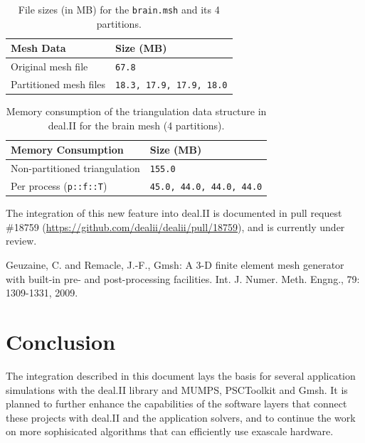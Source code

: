 \documentclass[a4paper,12pt]{article}
\begin{document}
\begin{table}[h!]
    \centering
    \begin{tabular}{@{}ll@{}}
        \toprule
        \textbf{Mesh Data}     & \textbf{Size (MB)}              \\ \midrule
        Original mesh file     & \texttt{67.8}                   \\
        Partitioned mesh files & \texttt{18.3, 17.9, 17.9, 18.0} \\
        \bottomrule
    \end{tabular}
    \caption{File sizes (in MB) for the \texttt{brain.msh} and its 4 partitions.}
    \label{tab:mesh-sizes}
\end{table}

\begin{table}[h!]
    \centering
    \begin{tabular}{@{}ll@{}}
        \toprule
        \textbf{Memory Consumption}    & \textbf{Size (MB)}              \\ \midrule
        Non-partitioned triangulation  & \texttt{155.0}                  \\
        Per process (\texttt{p::f::T}) & \texttt{45.0, 44.0, 44.0, 44.0} \\
        \bottomrule
    \end{tabular}
    \caption{Memory consumption of the triangulation data structure in deal.II for the brain mesh (4 partitions).}
    \label{tab:memory-consumption}
\end{table}


The integration of this new feature into deal.II is documented in
pull request \#18759 (\url{https://github.com/dealii/dealii/pull/18759}), and is
currently under review.

\begin{thebibliography}{10}
     Geuzaine, C. and Remacle, J.-F., Gmsh: A 3-D finite element mesh generator with built-in pre- and post-processing facilities. Int. J. Numer. Meth. Engng., 79: 1309-1331, 2009.
\end{thebibliography}


\newpage

\section{{Conclusion}} \label{sec:conclusion}

The integration described in this document lays the basis for several
application simulations with the deal.II library and MUMPS, PSCToolkit and
Gmsh. It is planned to further enhance the capabilities of the software layers
that connect these projects with deal.II and the application solvers, and to
continue the work on more sophisicated algorithms that can efficiently use
exascale hardware.

\label{MyLastPage}
\end{document}
